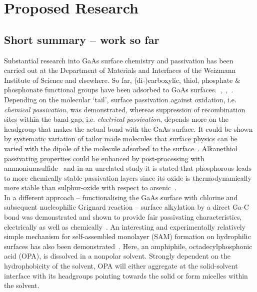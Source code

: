 \documentclass[a4paper]{article}
\begin{document}
\section*{Proposed Research}
\subsection*{Short summary -- work so far}
Substantial research into GaAs surface chemistry and passivation has been carried out at the Department of Materials and Interfaces of the Weizmann Institute of Science and elsewhere. So far, (di-)carboxylic, thiol, phosphate \& phosphonate functional groups have been adsorbed to GaAs surfaces.~\cite{Shpaisman1},~\cite{Shpaisman2},~\cite{thesis}. Depending on the molecular `tail', surface passivation against oxidation, i.e. \emph{chemical passivation}, was demonstrated, whereas suppression of recombination sites within the band-gap, i.e. \emph{electrical passivation}, depends more on the headgroup that makes the actual bond with the GaAs surface. It could be shown by systematic variation of tailor made molecules that surface physics can be varied with the dipole of the molecule adsorbed to the surface~\cite{VilanNature}. Alkanethiol passivating properties could be enhanced by post-processing with ammoniumsulfide~\cite{Dubowski} and in an unrelated study it is stated that phosphorous leads to more chemically stable passivation layers since its oxide is thermodynamically more stable than sulphur-oxide with respect to arsenic~\cite{oxidpaper}.\\
In a different approach -- functionalising the GaAs surface with chlorine and subsequent nucleophilic Grignard reaction -- surface alkylation by a direct Ga-C bond was demonstrated and shown to provide fair passivating characteristics, electrically as well as chemically~\cite{Grignard}. An interesting and experimentally relatively simple mechanism for self-assembled monolayer (SAM) formation on hydrophilic surfaces has also been demonstrated~\cite{Nie}. Here, an amphiphile,  octadecylphosphonic acid (OPA), is dissolved in a nonpolar solvent. Strongly dependent on the hydrophobicity of the solvent, OPA will either aggregate at the solid-solvent interface with its headgroups pointing towards the solid or form micelles within the solvent. 
\end{document}
